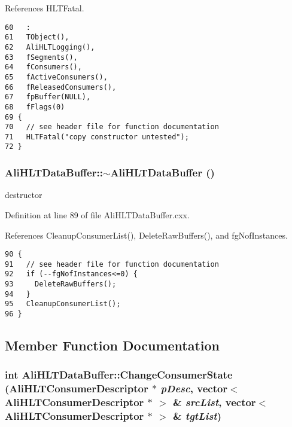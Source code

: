 References HLTFatal.

\footnotesize\begin{verbatim}60   :
61   TObject(),
62   AliHLTLogging(),
63   fSegments(),
64   fConsumers(),
65   fActiveConsumers(),
66   fReleasedConsumers(),
67   fpBuffer(NULL),
68   fFlags(0)
69 {
70   // see header file for function documentation
71   HLTFatal("copy constructor untested");
72 }

\end{verbatim}\normalsize 


\subsubsection{\setlength{\rightskip}{0pt plus 5cm}Ali\-HLTData\-Buffer::$\sim${\bf Ali\-HLTData\-Buffer} ()\hspace{0.3cm}{\tt  [virtual]}}\label{classAliHLTDataBuffer_a3}


destructor 

Definition at line 89 of file Ali\-HLTData\-Buffer.cxx.

References Cleanup\-Consumer\-List(), Delete\-Raw\-Buffers(), and fg\-Nof\-Instances.

\footnotesize\begin{verbatim}90 {
91   // see header file for function documentation
92   if (--fgNofInstances<=0) {
93     DeleteRawBuffers();
94   }
95   CleanupConsumerList();
96 }
\end{verbatim}\normalsize 




\subsection{Member Function Documentation}
\subsubsection{\setlength{\rightskip}{0pt plus 5cm}int Ali\-HLTData\-Buffer::Change\-Consumer\-State ({\bf Ali\-HLTConsumer\-Descriptor} $\ast$ {\em p\-Desc}, vector$<$ {\bf Ali\-HLTConsumer\-Descriptor} $\ast$ $>$ \& {\em src\-List}, vector$<$ {\bf Ali\-HLTConsumer\-Descriptor} $\ast$ $>$ \& {\em tgt\-List})\hspace{0.3cm}{\tt  [private]}}\label{classAliHLTDataBuffer_d3}


